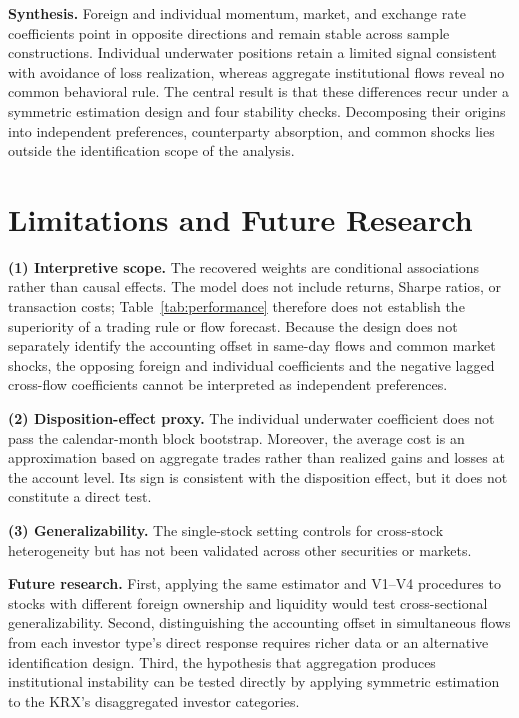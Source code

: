 \textbf{Synthesis.} Foreign and individual momentum, market, and exchange rate coefficients
point in opposite directions and remain stable across sample constructions. Individual
underwater positions retain a limited signal consistent with avoidance of loss realization,
whereas aggregate institutional flows reveal no common behavioral rule. The central result
is that these differences recur under a symmetric estimation design and four stability
checks. Decomposing their origins into independent preferences, counterparty absorption,
and common shocks lies outside the identification scope of the analysis.

\section{Limitations and Future Research}
\label{sec:limitations}

\textbf{(1) Interpretive scope.} The recovered weights are conditional associations rather
than causal effects. The model does not include returns, Sharpe ratios, or transaction costs;
Table~\ref{tab:performance} therefore does not establish the superiority of a trading rule
or flow forecast. Because the design does not separately identify the accounting offset in
same-day flows and common market shocks, the opposing foreign and individual coefficients
and the negative lagged cross-flow coefficients cannot be interpreted as independent
preferences.

\textbf{(2) Disposition-effect proxy.} The individual underwater coefficient does not pass
the calendar-month block bootstrap. Moreover, the average cost is an approximation based on
aggregate trades rather than realized gains and losses at the account level. Its sign is
consistent with the disposition effect, but it does not constitute a direct test.

\textbf{(3) Generalizability.} The single-stock setting controls for cross-stock
heterogeneity but has not been validated across other securities or markets.

\textbf{Future research.} First, applying the same estimator and V1--V4 procedures to
stocks with different foreign ownership and liquidity would test cross-sectional
generalizability. Second, distinguishing the accounting offset in simultaneous flows from
each investor type's direct response requires richer data or an alternative identification
design. Third, the hypothesis that aggregation produces institutional instability can be
tested directly by applying symmetric estimation to the KRX's disaggregated investor
categories.
